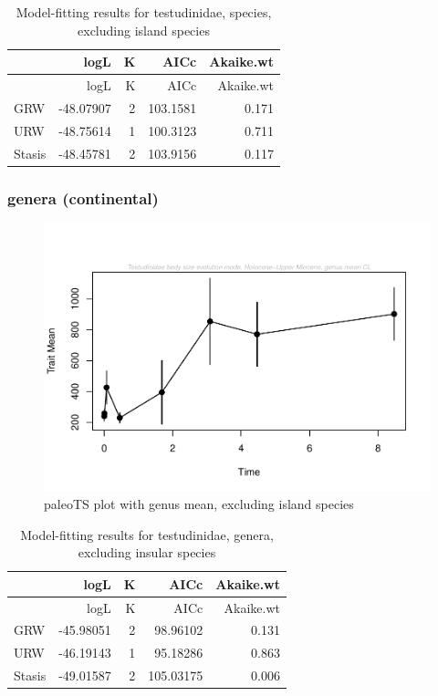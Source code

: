 \documentclass[]{article}
\begin{document}
\begin{longtable}[]{@{}lrrrr@{}}
\caption{Model-fitting results for testudinidae, species, excluding
island species}\tabularnewline
\toprule
& logL & K & AICc & Akaike.wt\tabularnewline
\midrule
\endfirsthead
\toprule
& logL & K & AICc & Akaike.wt\tabularnewline
\midrule
\endhead
GRW & -48.07907 & 2 & 103.1581 & 0.171\tabularnewline
URW & -48.75614 & 1 & 100.3123 & 0.711\tabularnewline
Stasis & -48.45781 & 2 & 103.9156 & 0.117\tabularnewline
\bottomrule
\end{longtable}

\newpage

\subsubsection{genera (continental)}\label{genera-continental}

\begin{figure}[htbp]
\centering
\includegraphics{MA_JJ_files/figure-latex/paleoTS plot with genus mean, excluding island species-1.pdf}
\caption{paleoTS plot with genus mean, excluding island species}
\end{figure}

\begin{longtable}[]{@{}lrrrr@{}}
\caption{Model-fitting results for testudinidae, genera, excluding
insular species}\tabularnewline
\toprule
& logL & K & AICc & Akaike.wt\tabularnewline
\midrule
\endfirsthead
\toprule
& logL & K & AICc & Akaike.wt\tabularnewline
\midrule
\endhead
GRW & -45.98051 & 2 & 98.96102 & 0.131\tabularnewline
URW & -46.19143 & 1 & 95.18286 & 0.863\tabularnewline
Stasis & -49.01587 & 2 & 105.03175 & 0.006\tabularnewline
\bottomrule
\end{longtable}
\end{document}
